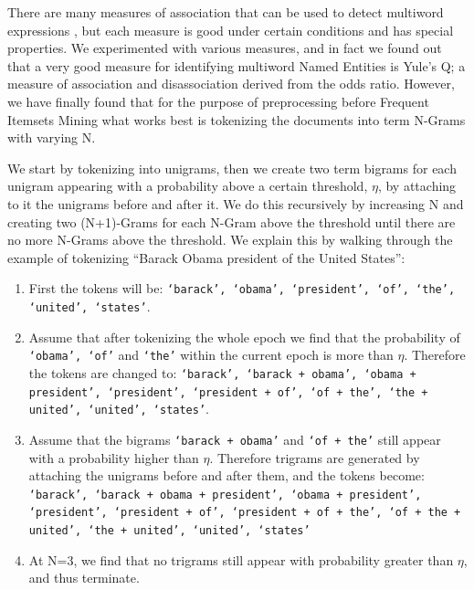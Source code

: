 \documentclass{sig-alternate}
\begin{document}
There are many measures of association that can be used to detect multiword expressions \cite{afzal}, but each measure is good under certain conditions and has special properties. We experimented with various measures, and in fact we found out that a very good measure for identifying multiword Named Entities is Yule's Q; a measure of association and disassociation derived from the odds ratio. However, we have finally found that for the purpose of preprocessing before Frequent Itemsets Mining what works best is tokenizing the documents into term N-Grams with varying N. 

We start by tokenizing into unigrams, then we
create two term bigrams for each unigram appearing with a probability above a certain threshold, $\eta$, by attaching to it the unigrams before and after it. We do this recursively by increasing N and creating two (N+1)-Grams for each N-Gram above the threshold until there are no more N-Grams above the threshold.
We explain this by walking through the example of tokenizing ``Barack Obama president of the United States'':

\begin{enumerate}
\item First the tokens will be: \texttt{`barack', `obama', `president', `of', `the', `united', `states'}. 
\item Assume that after tokenizing the whole epoch we find that the probability of \texttt{`obama', `of'} and \texttt{`the'} within the current epoch is more than $\eta$. Therefore the tokens are changed to: \texttt{`barack',  `barack + obama', `obama + president', `president', `president + \\of', `of + the', `the + united', `united', `states'}.
\item Assume that the bigrams  \texttt{`barack + obama'} and \texttt{`of + the'} still appear with a probability higher than $\eta$. Therefore trigrams are generated by attaching the unigrams before and after them, and the tokens become: \texttt{`barack',  `barack + obama + president', `obama + president', `president', `president + of', `president + of + the', `of + the + united', `the + \\united', `united', `states'}
\item At N=3, we find that no trigrams still appear with probability greater than $\eta$, and thus terminate.
\end{enumerate}
\end{document}
